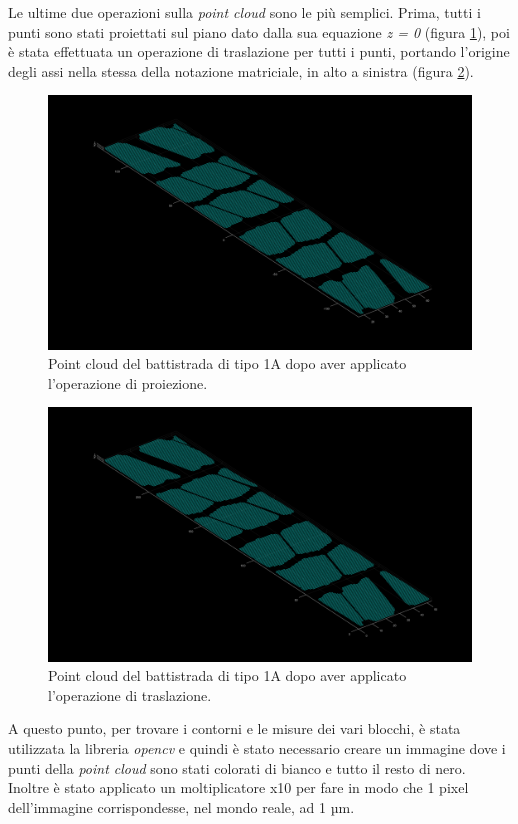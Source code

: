 \noindent Le ultime due operazioni sulla \textit{point cloud} sono le più semplici. Prima, tutti i punti sono stati proiettati sul piano dato dalla sua equazione \textit{z = 0} (figura \ref{fig:batt_1a_analisi_4}), poi è stata effettuata un operazione di traslazione per tutti i punti, portando l'origine degli assi nella stessa della notazione matriciale, in alto a sinistra (figura \ref{fig:batt_1a_analisi_5}).\\

\begin{figure}[H]
	\centering
	\includegraphics[width=0.8\columnwidth]{./pictures/batt_1a_analisi_4.png}
	\caption{Point cloud del battistrada di tipo 1A dopo aver applicato l'operazione di proiezione.}\label{fig:batt_1a_analisi_4}
\end{figure}

\begin{figure}[H]
	\centering
	\includegraphics[width=0.8\columnwidth]{./pictures/batt_1a_analisi_5.png}
	\caption{Point cloud del battistrada di tipo 1A dopo aver applicato l'operazione di traslazione.}\label{fig:batt_1a_analisi_5}
\end{figure}

\noindent A questo punto, per trovare i contorni e le misure dei vari blocchi, è stata utilizzata la libreria \textit{opencv} e quindi è stato necessario creare un immagine dove i punti della \textit{point cloud} sono stati colorati di bianco e tutto il resto di nero.\\
Inoltre è stato applicato un moltiplicatore x10 per fare in modo che 1 pixel dell'immagine corrispondesse, nel mondo reale, ad 1 µm.\\

